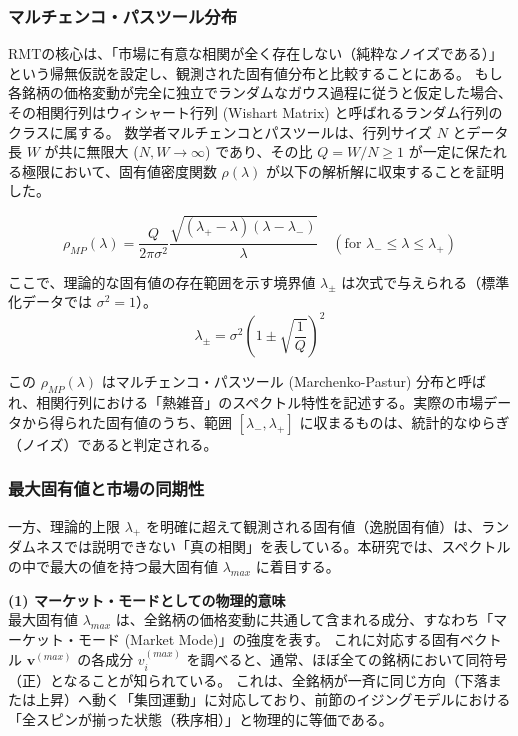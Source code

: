 \documentclass[11pt,a4paper,oneside]{ltjsarticle}
\begin{document}
\subsubsection{マルチェンコ・パスツール分布}
RMTの核心は、「市場に有意な相関が全く存在しない（純粋なノイズである）」という帰無仮説を設定し、観測された固有値分布と比較することにある。
もし各銘柄の価格変動が完全に独立でランダムなガウス過程に従うと仮定した場合、その相関行列はウィシャート行列 (Wishart Matrix) と呼ばれるランダム行列のクラスに属する。
数学者マルチェンコとパスツールは、行列サイズ $N$ とデータ長 $W$ が共に無限大 ($N, W \to \infty$) であり、その比 $Q = W/N \ge 1$ が一定に保たれる極限において、固有値密度関数 $\rho(\lambda)$ が以下の解析解に収束することを証明した。

\begin{equation}
\rho_{MP}(\lambda) = \frac{Q}{2\pi\sigma^2} \frac{\sqrt{(\lambda_{+} - \lambda)(\lambda - \lambda_{-})}}{\lambda} \quad (\text{for } \lambda_{-} \le \lambda \le \lambda_{+})
\end{equation}

ここで、理論的な固有値の存在範囲を示す境界値 $\lambda_{\pm}$ は次式で与えられる（標準化データでは $\sigma^2=1$）。
\begin{equation}
\lambda_{\pm} = \sigma^{2} \left( 1 \pm \sqrt{\frac{1}{Q}} \right)^{2}
\end{equation}

この $\rho_{MP}(\lambda)$ はマルチェンコ・パスツール (Marchenko-Pastur) 分布と呼ばれ、相関行列における「熱雑音」のスペクトル特性を記述する。実際の市場データから得られた固有値のうち、範囲 $[\lambda_{-}, \lambda_{+}]$ に収まるものは、統計的なゆらぎ（ノイズ）であると判定される。

\subsubsection{最大固有値と市場の同期性}
一方、理論的上限 $\lambda_{+}$ を明確に超えて観測される固有値（逸脱固有値）は、ランダムネスでは説明できない「真の相関」を表している。本研究では、スペクトルの中で最大の値を持つ最大固有値 $\lambda_{max}$ に着目する。

\textbf{(1) マーケット・モードとしての物理的意味} \\
最大固有値 $\lambda_{max}$ は、全銘柄の価格変動に共通して含まれる成分、すなわち「マーケット・モード (Market Mode)」の強度を表す。
これに対応する固有ベクトル $\mathbf{v}^{(max)}$ の各成分 $v_{i}^{(max)}$ を調べると、通常、ほぼ全ての銘柄において同符号（正）となることが知られている。
これは、全銘柄が一斉に同じ方向（下落または上昇）へ動く「集団運動」に対応しており、前節のイジングモデルにおける「全スピンが揃った状態（秩序相）」と物理的に等価である。
\end{document}
